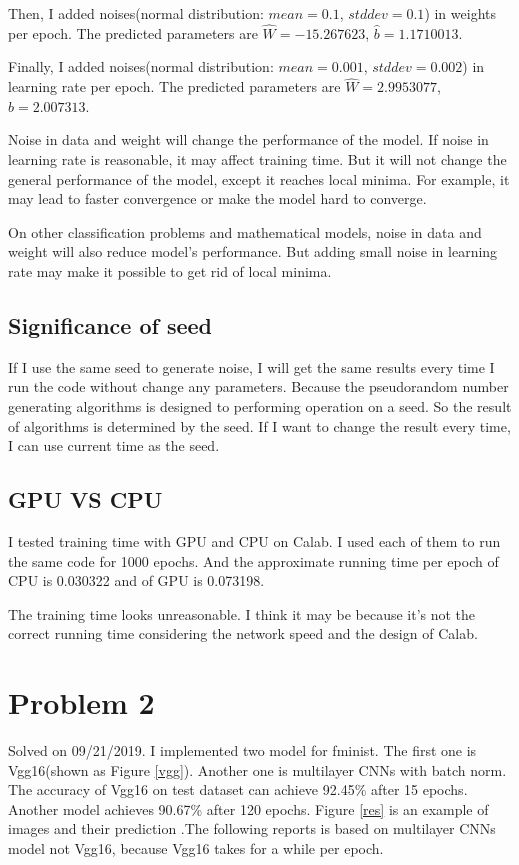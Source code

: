 \documentclass{article}
\begin{document}
Then, I added noises(normal distribution: $mean = 0.1$, $stddev=0.1$) in weights per epoch. The predicted parameters are $\hat{W} = -15.267623$, $\hat{b}=1.1710013$. 

Finally, I added noises(normal distribution: $mean = 0.001$, $stddev=0.002$) in learning rate per epoch. The predicted parameters are $\hat{W} = 2.9953077$, $\hat{b}=2.007313$. 

Noise in data and weight will change the performance of the model. If noise in learning rate is reasonable, it may affect training time. But it will not change the general performance of the model, except it reaches local minima. For example, it may lead to faster convergence or make the model hard to converge. 

On other classification problems and mathematical models, noise in data and weight will also reduce model's performance. But adding small noise in learning rate may make it possible to get rid of local minima.  

\subsection{Significance of seed}
If I use the same seed to generate noise, I will get the same results every time I run the code without change any parameters. Because the pseudorandom number generating algorithms is designed to performing operation on a seed. So the result of algorithms is determined by the seed. If I want to change the result every time, I can use current time as the seed.


\subsection{GPU VS CPU}
I tested training time with GPU and CPU on Calab. I used each of them to run the same code for 1000 epochs. And the approximate running time per epoch of CPU is 0.030322 and of GPU is 0.073198. 

The training time looks unreasonable. I think it may be because it's not the correct running time considering the network speed and the design of Calab.

\section{Problem 2}
Solved on 09/21/2019. I implemented two model for fminist. The first one is Vgg16(shown as Figure \ref{vgg}). Another one is multilayer CNNs with batch norm. The accuracy of Vgg16 on test dataset can achieve 92.45\% after 15 epochs. Another model achieves 90.67\% after 120 epochs. Figure \ref{res} is an example of images and their prediction .The following reports is based on multilayer CNNs model not Vgg16, because Vgg16 takes for a while per epoch.
\end{document}

